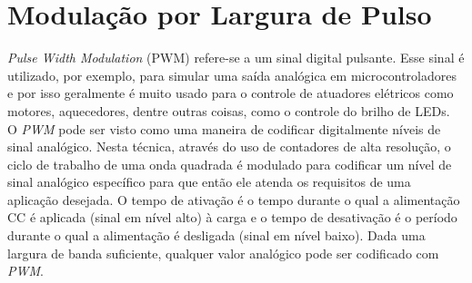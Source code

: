 \section{Modulação por Largura de Pulso}

\emph{Pulse Width Modulation} (PWM) refere-se a um sinal digital pulsante. Esse sinal é utilizado, por exemplo, para simular uma saída analógica em microcontroladores e por isso geralmente é muito usado para o controle de atuadores elétricos como motores, aquecedores, dentre outras coisas, como o controle do brilho de LEDs. \\

O \emph{PWM} pode ser visto como uma maneira de codificar digitalmente níveis de sinal analógico. Nesta técnica, através do uso de contadores de alta resolução, o ciclo de trabalho de uma onda quadrada é modulado para codificar um nível de sinal analógico específico para que então ele atenda os requisitos de uma aplicação desejada. O tempo de ativação é o tempo durante o qual a alimentação CC é aplicada (sinal em nível alto) à carga e o tempo de desativação é o período durante o qual a alimentação é desligada (sinal em nível baixo). Dada uma largura de banda suficiente, qualquer valor analógico pode ser codificado com \emph{PWM}.